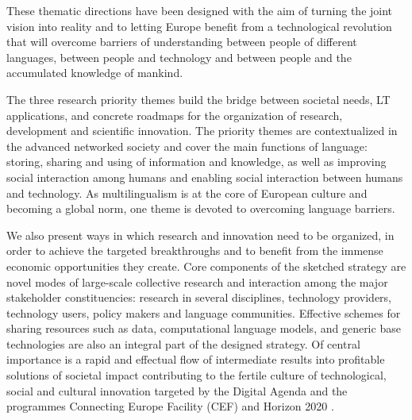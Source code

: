 \documentclass[10pt, plain]{../../metanetpaper}
\begin{document}
\begin{multicols}{2}
These thematic directions have been designed with the aim of turning the joint vision into reality and to letting Europe benefit from a technological revolution that will overcome barriers of understanding between people of different languages, between people and technology and between people and the accumulated knowledge of mankind.

The three research priority themes build the bridge between societal needs, LT applications, and concrete roadmaps for the organization of research, development and scientific innovation. The priority themes are contextualized in the advanced networked society and cover the main functions of language: storing, sharing and using of information and knowledge, as well as improving social interaction among humans and enabling social interaction between humans and technology. As multilingualism is at the core of European culture and becoming a global norm, one theme is devoted to overcoming language barriers.

We also present ways in which research and innovation need to be organized, in order to achieve the targeted breakthroughs and to benefit from the immense economic opportunities they create. Core components of the sketched strategy are novel modes of large-scale collective research and interaction among the major stakeholder constituencies: research in several disciplines, technology providers, technology users, policy makers and language communities. Effective schemes for sharing resources such as data, computational language models, and generic base technologies are also an integral part of the designed strategy. Of central importance is a rapid and effectual flow of intermediate results into profitable solutions of societal impact contributing to the fertile culture of technological, social and cultural innovation targeted by the Digital Agenda and the programmes Connecting Europe Facility (CEF) \cite{CEF2011} and Horizon 2020 \cite{H2020}.
\end{multicols}

\clearpage



\end{document}
